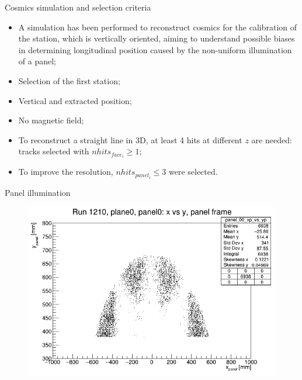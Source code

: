 \documentclass{beamer}[10pt]
\begin{document}
\begin{frame}{Cosmics simulation and selection criteria}
  \begin{itemize}
    \item 
    A simulation has been performed to reconstruct cosmics for the calibration of the station, which is vertically oriented, 
    aiming to understand possible biases in determining longitudinal position caused by the non-uniform illumination of a panel;
    \vspace{3mm}
    \item Selection of the first station;
    \vspace{3mm}
    \item Vertical and extracted position;
    \vspace{3mm}
    \item No magnetic field;
    \vspace{3mm}
    \item To reconstruct a straight line in 3D, at least 4 hits at different $z$ are needed: tracks selected with $nhits_{face_i}\geq 1$;
    \vspace{3mm}
    \item To improve the resolution, $nhits_{panel_i}\leq 3$ were selected.
  \end{itemize}
\end{frame}
\begin{frame}{Panel illumination}
   
            \begin{figure}[H]
                \centering
                \includegraphics[width=0.8 \textwidth]{figures/pdf/xp_vs_yp_panel0.png}
                \label{fig:enter-label}
            \end{figure}

\end{frame}
\end{document}
